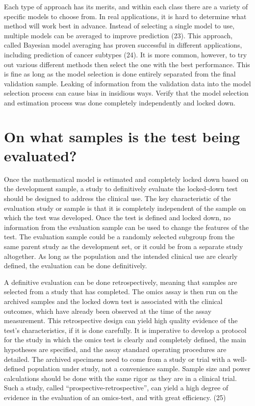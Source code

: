 \documentclass[11pt]{article}
\begin{document}
Each type of approach has its merits, and within each class there are a
variety of specific models to choose from. In real applications, it is
hard to determine what method will work best in advance. Instead of
selecting a single model to use, multiple models can be averaged to
improve prediction (23). This approach, called Bayesian model averaging
has proven successful in different applications, including prediction of
cancer subtypes (24). It is more common, however, to try out various
different methods then select the one with the best performance. This is
fine as long as the model selection is done entirely separated from the
final validation sample. Leaking of information from the validation data
into the model selection process can cause bias in insidious ways.
Verify that the model selection and estimation process was done
completely independently and locked down.

\section{On what samples is the test being
evaluated?}\label{on-what-samples-is-the-test-being-evaluated}

Once the mathematical model is estimated and completely locked down
based on the development sample, a study to definitively evaluate the
locked-down test should be designed to address the clinical use. The key
characteristic of the evaluation study or sample is that it is
completely independent of the sample on which the test was developed.
Once the test is defined and locked down, no information from the
evaluation sample can be used to change the features of the test. The
evaluation sample could be a randomly selected subgroup from the same
parent study as the development set, or it could be from a separate
study altogether. As long as the population and the intended clinical
use are clearly defined, the evaluation can be done definitively.

A definitive evaluation can be done retrospectively, meaning that
samples are selected from a study that has completed. The omics assay is
then run on the archived samples and the locked down test is associated
with the clinical outcomes, which have already been observed at the time
of the assay measurement. This retrospective design can yield high
quality evidence of the test's characteristics, if it is done carefully.
It is imperative to develop a protocol for the study in which the omics
test is clearly and completely defined, the main hypotheses are
specified, and the assay standard operating procedures are detailed. The
archived specimens need to come from a study or trial with a
well-defined population under study, not a convenience sample. Sample
size and power calculations should be done with the same rigor as they
are in a clinical trial. Such a study, called
``prospective-retrospective'', can yield a high degree of evidence in
the evaluation of an omics-test, and with great efficiency. (25)
\end{document}
